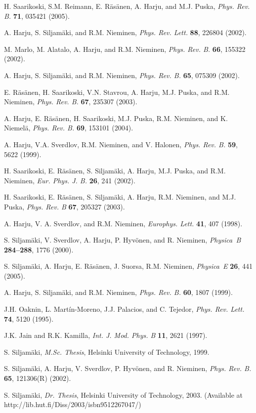 \documentclass{article}
\begin{document}
\begin{thebibliography}{9}
H. Saarikoski, S.M. Reimann, E. R\"as\"anen, A. Harju, and M.J. Puska,
{\it Phys. Rev. B.} {\bf 71}, 035421 (2005).

 A. Harju, S. Siljam\"aki, and R.M. Nieminen,
{\it Phys. Rev. Lett.} {\bf 88}, 226804 (2002).

M. Marlo, M. Alatalo, A. Harju, and R.M. Nieminen,
  {\it Phys. Rev. B.} {\bf 66}, 155322 (2002).

A. Harju, S. Siljam\"aki, and R.M. Nieminen,
{\it Phys. Rev. B.} {\bf 65}, 075309 (2002).

E. R\"as\"anen, H. Saarikoski, V.N. Stavrou, A. Harju,
  M.J. Puska, and R.M. Nieminen, {\it Phys. Rev. B.} {\bf 67}, 235307
  (2003).

A. Harju, E. R\"as\"anen, H. Saarikoski, M.J. Puska,
R.M. Nieminen, and K. Niemel\"a, {\it Phys. Rev. B.} {\bf 69}, 153101
(2004).

A. Harju, V.A. Sverdlov, R.M. Nieminen, and
V. Halonen, {\it Phys. Rev. B.} {\bf 59}, 5622 (1999).

H. Saarikoski, E. R\"as\"anen, S. Siljam\"aki, A. Harju,
M.J. Puska, and R.M. Nieminen,
{\it Eur. Phys. J. B.} {\bf 26}, 241 (2002).

H. Saarikoski, E. R\"as\"anen, S. Siljam\"aki, A. Harju,
R.M. Nieminen, and M.J. Puska, {\it Phys. Rev. B} {\bf 67}, 205327 (2003).

A. Harju, V. A. Sverdlov, and R.M. Nieminen,
{\it Europhys. Lett.} {\bf 41}, 407 (1998).


S. Siljam\"aki, V. Sverdlov, A. Harju,
P. Hyv\"onen, and R. Nieminen, {\it Physica~B} {\bf 284--288},
1776 (2000).

S. Siljam\"aki, A. Harju, E. R\"as\"anen, J. Suorsa,
R.M. Nieminen, {\it Physica~E} {\bf 26}, 441 (2005).

A. Harju, S. Siljam\"aki, and R.M. Nieminen,
{\it Phys. Rev. B.} {\bf 60}, 1807 (1999).

 J.H. Oaknin, L. Mart\'in-Moreno, J.J. Palacios, and C.
  Tejedor, {\it Phys. Rev. Lett.} {\bf 74}, 5120 (1995).

 J.K. Jain and R.K. Kamilla, {\it Int. J. Mod. Phys. B} {\bf
11}, 2621 (1997).

 S. Siljam\"aki, {\it M.Sc. Thesis}, Helsinki University of
Technology, 1999.

S. Siljam\"aki, A. Harju,
V. Sverdlov, P. Hyv\"onen, and R. Nieminen, {\it Phys. Rev. B.}
{\bf 65}, 121306(R) (2002).

 S. Siljam\"aki, {\it Dr. Thesis}, Helsinki University of
Technology, 2003. (Available at http://lib.hut.fi/Diss/2003/isbn9512267047/)

\end{thebibliography}
\end{document}
